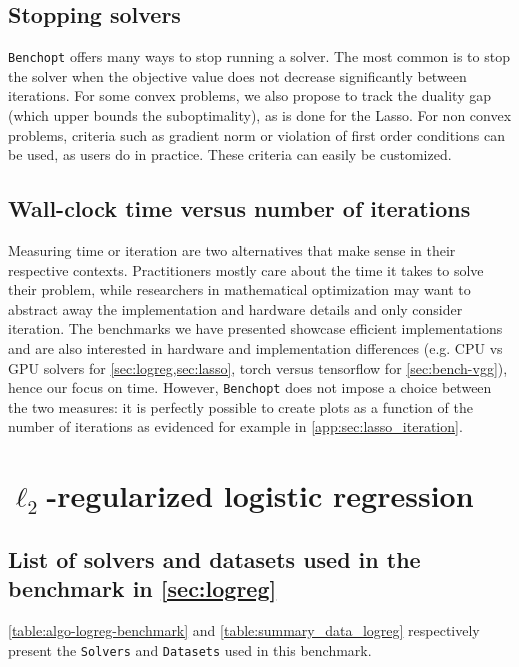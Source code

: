 \documentclass{article}
\newcommand{\rebuttal}[1]{#1}
\newcommand{\Benchopt}{{{\texttt{Benchopt}}}}
\begin{document}
\subsection{Stopping solvers}
\label{app:sec:stopping_solver}
\rebuttal{
\Benchopt{} offers many ways to stop running a solver.
The most common is to stop the solver when the objective value does not decrease significantly between iterations.
For some convex problems, we also propose to track the duality gap (which upper bounds the suboptimality), as is done for the Lasso.
For non convex problems, criteria such as gradient norm or violation of first order conditions can be used, as users do in practice.
These criteria can easily be customized.
}

\subsection{Wall-clock time versus number of iterations}
\label{app:sec:wall_clock_time}
\rebuttal{
Measuring time or iteration are two alternatives that make sense in their respective contexts. Practitioners mostly care about the time it takes to solve their problem, while researchers in mathematical optimization may want to abstract away the implementation and hardware details and only consider iteration.
The benchmarks we have presented showcase efficient implementations and are also interested in hardware and implementation differences (e.g. CPU vs GPU solvers for \autoref{sec:logreg,sec:lasso}, torch versus tensorflow for \autoref{sec:bench-vgg}), hence our focus on time.
However, \Benchopt{} does not impose a choice between the two measures: it is perfectly possible to create plots as a function of the number of iterations as evidenced for example in \autoref{app:sec:lasso_iteration}.
}\clearpage{}

\clearpage{}\section{\texorpdfstring{$\ell_2$}{l2}-regularized logistic regression}
\label{app:logregl2}


\subsection{List of solvers and datasets used in the benchmark in \autoref{sec:logreg}}

\autoref{table:algo-logreg-benchmark} and \autoref{table:summary_data_logreg} respectively present the \texttt{Solvers} and \texttt{Datasets} used in this benchmark.
\end{document}
